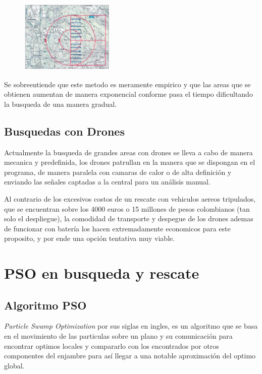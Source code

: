 \documentclass[journal]{IEEEtran}
\begin{document}
\begin{center}
\begin{figure}[h]
\includegraphics[width=0.4\textwidth]{Radio_SnR}
\end{figure}
\end{center}

Se sobreentiende que este metodo es meramente empirico y que las areas que se obtienen aumentan de manera exponencial conforme pasa el tiempo dificultando la busqueda de una manera gradual.

\subsection{Busquedas con Drones}
Actualmente la busqueda de grandes areas con drones se lleva a cabo de manera mecanica y predefinida, los drones patrullan en la manera que se dispongan en el programa, de manera paralela con camaras de calor o de alta definición y enviando las señales captadas a la central para un análisis manual.

Al contrario de los excesivos costos de un rescate con vehiculos aereos tripulados, que se encuentran sobre los 4000 euros o 15 millones de pesos colombianos (tan solo el despliegue), la comodidad de transporte y despegue de los drones ademas de funcionar con batería los hacen extremadamente economicos para este proposito, y por ende una opción tentativa muy viable. 
\section{PSO en busqueda y rescate}
\subsection{Algoritmo PSO}
\textit{Particle Swamp Optimization} por sus siglas en ingles, es un algoritmo que se basa en el movimiento de las particulas sobre un plano y su comunicación para encontrar optimos locales y compararlo con los encontrados por otros componentes del enjambre para así llegar a una notable aproximación del optimo global.
\end{document}
